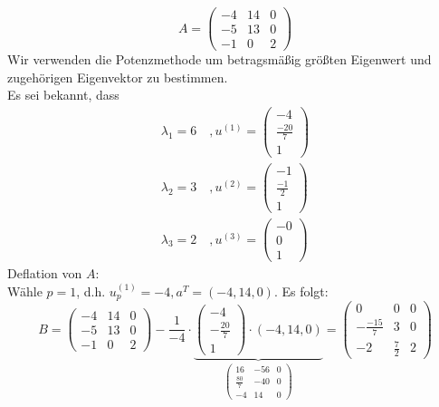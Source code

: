 \begin{egbox}
    \[A = \begin{pmatrix}
        -4 & 14 & 0 \\ -5 & 13 & 0 \\ -1 & 0 & 2
    \end{pmatrix}\]
    Wir verwenden die Potenzmethode um betragsmäßig größten Eigenwert und zugehörigen Eigenvektor zu bestimmen. \\
    Es sei bekannt, dass 
    \begin{align*}
        \lambda_1=6 \quad, u^{(1)}=\begin{pmatrix}
            -4 \\ \tfrac{-20}{7} \\ 1
        \end{pmatrix} \\
        \lambda_2=3 \quad, u^{(2)}=\begin{pmatrix}
            -1 \\ \tfrac{-1}{2} \\ 1
        \end{pmatrix} \\
        \lambda_3=2 \quad, u^{(3)}=\begin{pmatrix}
            -0 \\ 0 \\ 1
        \end{pmatrix}
    \end{align*}
    Deflation von $A$: \\
    Wähle $p = 1$, d.h. $u_p^{(1)} = -4, a^T=(-4, 14, 0)$. Es folgt:
    \[B = \begin{pmatrix}
        -4 & 14 & 0 \\ -5 & 13 & 0 \\ -1 & 0 & 2
    \end{pmatrix} - \dfrac{1}{-4}\cdot\underbrace{\begin{pmatrix}
        -4 \\ -\tfrac{20}{7} \\ 1
    \end{pmatrix}\cdot(-4, 14, 0)}_{\begin{pmatrix}
        16 & -56 & 0 \\
        \tfrac{80}{7} & -40 & 0 \\
        -4 & 14 & 0
    \end{pmatrix} } = \begin{pmatrix}
        0 & 0 & 0 \\ -\tfrac{-15}{7} & 3 & 0 \\ -2 & \tfrac{7}{2} & 2

\end{pmatrix}\]
\end{egbox}
